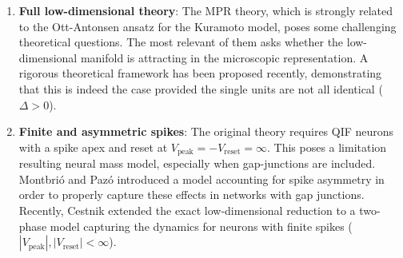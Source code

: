 \documentclass[12pt]{article}
\numberwithin{equation}{section}
\newcommand{\rev}[1]{\begingroup\color{navyblue}#1\endgroup}
\begin{document}
\begin{enumerate}
    \item \textbf{Full low-dimensional theory}: The MPR theory, which is strongly related to the Ott-Antonsen ansatz for the Kuramoto model\cite{Ott2008}, poses some challenging theoretical questions. The most relevant of them asks whether the low-dimensional manifold is attracting in the microscopic representation. A rigorous theoretical framework has been proposed recently, demonstrating that this is indeed the case provided the single units are not all identical ($\Delta>0$)\cite{Pietras2023}. 
    \rev{\item \textbf{Finite and asymmetric spikes}: The original theory requires QIF neurons with a 
    spike apex and reset at $V_\text{peak}=-V_\text{reset} = \infty$. This poses a limitation resulting neural mass model,
    especially when gap-junctions are included. Montbrió and Pazó \cite{montbrio2020} introduced a model accounting for spike asymmetry
     in order to properly capture these effects in networks with gap junctions. Recently, Cestnik \cite{cestnik2026} extended the exact low-dimensional reduction to a two-phase model capturing the dynamics for neurons with finite spikes ($|V_\text{peak}|,|V_\text{reset}| < \infty$).}
\end{enumerate}

\end{document}
